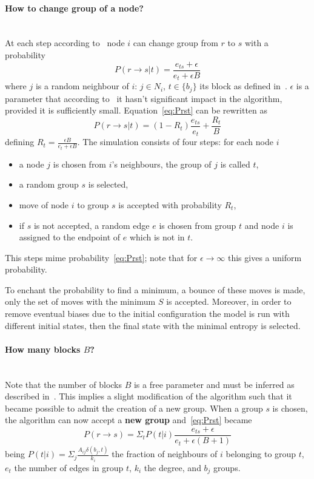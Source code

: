 \paragraph{How to change group of a node?}\mbox{}\\
At each step according to~\cite{peixoto2014efficient} node $i$ can change group from $r$ to $s$ with a probability
\begin{equation}\label{eq:Prst}
  P(r\to s|t)=\frac{e_{ts}+\epsilon}{e_t+\epsilon B}
\end{equation}
where $j$ is a random neighbour of $i$: $j\in N_i$, $t\in\{b_j\}$ its block as defined in~\cite{peixoto2014efficient}. $\epsilon$ is a parameter that according to~\cite{peixoto2017nonparametric} it hasn't significant impact in the algorithm, provided it is sufficiently small.
Equation~\ref{eq:Prst} can be rewritten as \[P(r\to s|t)=(1-R_t)\frac{e_{ts}}{e_t}+\frac{R_t}{B}\] defining $R_t=\frac{\epsilon B}{e_t + \epsilon B}$.
The simulation consists of four steps: for each node $i$
\begin{itemize}
  \item a node $j$ is chosen from $i$'s neighbours, the group of $j$ is called
  $t$,
  \item a random group $s$ is selected,
  \item move of node $i$ to group $s$ is accepted with probability $R_t$,
  \item if $s$ is not accepted, a random edge $e$ is chosen from group $t$ and node $i$ is assigned to the endpoint of $e$ which is not in $t$.
\end{itemize}
This steps mime probability~\ref{eq:Prst}; note that for $\epsilon\to\infty$ this gives a uniform probability.

To enchant the probability to find a minimum, a bounce of these moves is made, only the set of moves with the minimum $S$ is accepted. Moreover, in order to remove eventual biases due to the initial configuration the model is run with different initial states, then the final state with the minimal entropy is selected.

\paragraph{How many blocks $B$?}\mbox{}\\
Note that the number of blocks $B$ is a free parameter and must be inferred as described in~\cite{peixoto2017nonparametric}. This implies a slight modification of the algorithm such that it became possible to admit the creation of  a new group.
When a group $s$ is chosen, the algorithm can now accept a \textbf{new group} and~\ref{eq:Prst} became
\begin{equation}\label{eq:PrstB1}
  P(r\to s)=\Sigma_t P(t|i)\frac{e_{ts}+\epsilon}{e_t+\epsilon (B+1)}
\end{equation}
being $P(t|i)=\Sigma_j\frac{A_{ij}\delta(b_j, t)}{k_i}$ the fraction of neighbours of $i$ belonging to group $t$, $e_t$ the number of edges in group $t$,
$k_i$ the degree, and $b_j$ groups.


